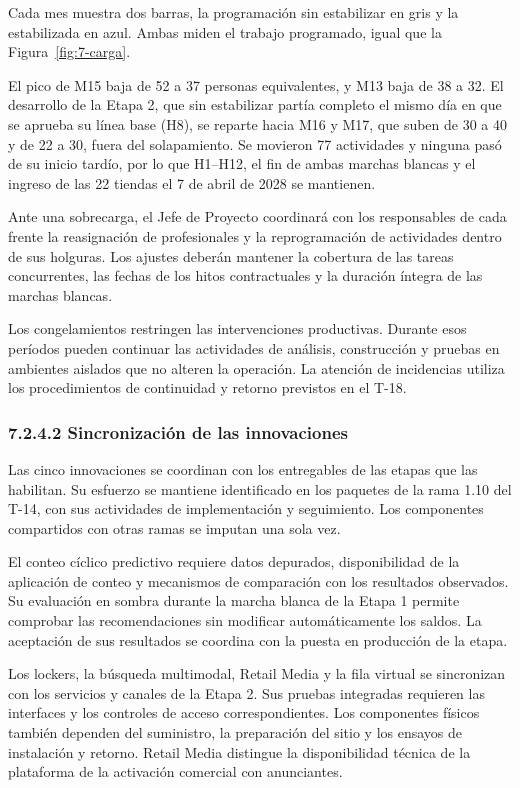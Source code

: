 \documentclass[11pt]{article}
\begin{document}
Cada mes muestra dos barras, la programación sin estabilizar en gris y la estabilizada en azul. Ambas miden el trabajo programado, igual que la Figura~\ref{fig:7-carga}.

El pico de M15 baja de 52 a 37 personas equivalentes, y M13 baja de 38 a 32. El desarrollo de la Etapa 2, que sin estabilizar partía completo el mismo día en que se aprueba su línea base (H8), se reparte hacia M16 y M17, que suben de 30 a 40 y de 22 a 30, fuera del solapamiento. Se movieron 77 actividades y ninguna pasó de su inicio tardío, por lo que H1--H12, el fin de ambas marchas blancas y el ingreso de las 22 tiendas el 7 de abril de 2028 se mantienen.

Ante una sobrecarga, el Jefe de Proyecto coordinará con los responsables de cada frente la reasignación de profesionales y la reprogramación de actividades dentro de sus holguras. Los ajustes deberán mantener la cobertura de las tareas concurrentes, las fechas de los hitos contractuales y la duración íntegra de las marchas blancas.

Los congelamientos restringen las intervenciones productivas. Durante esos períodos pueden continuar las actividades de análisis, construcción y pruebas en ambientes aislados que no alteren la operación. La atención de incidencias utiliza los procedimientos de continuidad y retorno previstos en el T-18.

\subsubsection{7.2.4.2 Sincronización de las innovaciones}

Las cinco innovaciones se coordinan con los entregables de las etapas que las habilitan. Su esfuerzo se mantiene identificado en los paquetes de la rama 1.10 del T-14, con sus actividades de implementación y seguimiento. Los componentes compartidos con otras ramas se imputan una sola vez.

El conteo cíclico predictivo requiere datos depurados, disponibilidad de la aplicación de conteo y mecanismos de comparación con los resultados observados. Su evaluación en sombra durante la marcha blanca de la Etapa 1 permite comprobar las recomendaciones sin modificar automáticamente los saldos. La aceptación de sus resultados se coordina con la puesta en producción de la etapa.

Los lockers, la búsqueda multimodal, Retail Media y la fila virtual se sincronizan con los servicios y canales de la Etapa 2. Sus pruebas integradas requieren las interfaces y los controles de acceso correspondientes. Los componentes físicos también dependen del suministro, la preparación del sitio y los ensayos de instalación y retorno. Retail Media distingue la disponibilidad técnica de la plataforma de la activación comercial con anunciantes.
\end{document}
